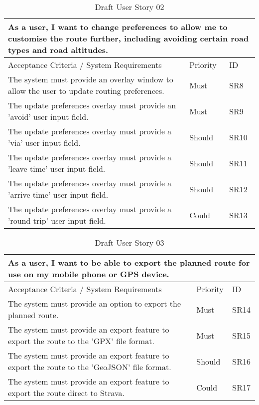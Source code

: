 \begin{table}[!htb]
\caption{Draft User Story 02}
\label{appendix:tab:user-story-02}
\begin{tabular}{ p{11cm} p{1cm}  p{1cm} }
\hline
\multicolumn{3}{p{13cm}}{As a user, I want to change preferences to allow me to customise the route further, including avoiding certain road types and road altitudes.}\\ 
\hline
Acceptance Criteria / System Requirements & Priority & ID\\
\hline
The system must provide an overlay window to allow the user to update routing preferences. & Must & SR8 \\
The update preferences overlay must provide an 'avoid' user input field. & Must & SR9\\
The update preferences overlay must provide a 'via' user input field. & Should & SR10\\ 
The update preferences overlay must provide a 'leave time' user input field. & Should & SR11\\ 
The update preferences overlay must provide a 'arrive time' user input field. & Should & SR12\\ 
The update preferences overlay must provide a 'round trip' user input field. & Could & SR13\\ 
\hline
\end{tabular}
\end{table}

\begin{table}[!htb]
\caption{Draft User Story 03}
\label{appendix:tab:user-story-03}
\begin{tabular}{ p{11cm} p{1cm}  p{1cm} }
\hline
\multicolumn{3}{p{13cm}}{As a user, I want to be able to export the planned route for use on my mobile phone or GPS device.}\\ 
\hline
Acceptance Criteria / System Requirements & Priority & ID\\
\hline
The system must provide an option to export the planned route. & Must & SR14 \\
The system must provide an export feature to export the route to the 'GPX' file format. & Must & SR15\\
The system must provide an export feature to export the route to the 'GeoJSON' file format. & Should & SR16\\ 
The system must provide an export feature to export the route direct to Strava. & Could & SR17\\ 
\hline
\end{tabular}
\end{table}

